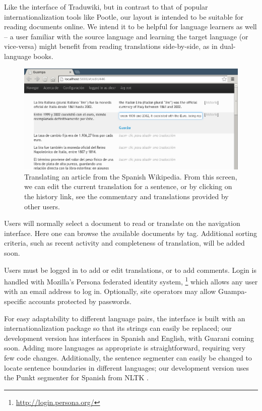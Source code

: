 \documentclass[10pt, a4paper]{article}
\begin{document}
Like the interface of Traduwiki, but in contrast to that of popular
internationalization tools like Pootle, our layout is intended to be suitable
for reading documents online. We intend it to be helpful for language learners
as well -- a user familiar with the source language and learning the target
language (or vice-versa) might benefit from reading translations side-by-side,
as in dual-language books.

\begin{figure}
  \begin{center}
\includegraphics[width=12cm]{guampa-edit-cropped}
  \end{center}
\caption{Translating an article from the Spanish Wikipedia. From this screen,
we can edit the current translation for a sentence, or by clicking on the
history link, see the commentary and translations provided by other users.}
\end{figure}

Users will normally select a document to read or translate on the navigation
interface. Here one can browse the available documents by tag. Additional
sorting criteria, such as recent activity and completeness of translation, will
be added soon.

Users must be logged in to add or edit translations, or to add comments.
Login is handled with Mozilla's Persona federated identity system,
\footnote{\url{http://login.persona.org/}}
which allows any user with an email address to log in.
Optionally, site operators may allow Guampa-specific accounts protected by
passwords.

For easy adaptability to different language pairs, the interface is built with
an internationalization package so that its strings can easily be replaced; our
development version has interfaces in Spanish and English, with Guarani coming
soon. Adding more languages as appropriate is straightforward, requiring very
few code changes. Additionally, the sentence segmenter can easily be changed
to locate sentence boundaries in different languages; our development
version uses the Punkt segmenter for Spanish from NLTK \cite{nltkbook}.
\end{document}
